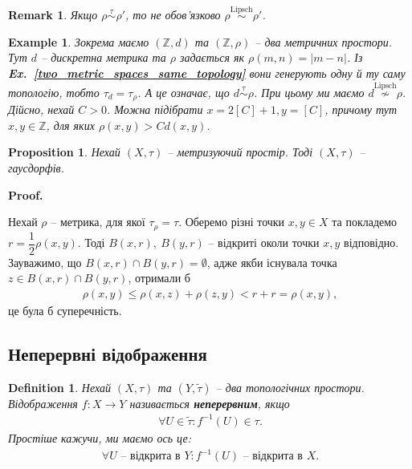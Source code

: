 \documentclass[a4paper, 10pt]{article}
\makeatletter
\theoremstyle{theoremdd}
\newtheorem{definition}[theorem]{Definition}
\newtheorem{example}[theorem]{Example}
\newtheorem{proposition}[theorem]{Proposition}
\newtheorem{remark}[theorem]{Remark}
\newcommand\exref[1]{\textbf{Ex.~\ref{#1}}}
\renewenvironment{proof}[1][Proof.\\]{\par
\pushQED{\hfill \qed}%
\normalfont \topsep6\p@\@plus6\p@\relax
\trivlist
\item\relax
{\bfseries
#1\@addpunct{.}}\hspace\labelsep\ignorespaces
}{%
\popQED\endtrivlist\@endpefalse
}
\makeatother
\begin{document}
\begin{remark}
Якщо $\rho \overset{\tau}{\sim} \rho'$, то не обов'язково $\rho \overset{\text{Lipsch}}{\sim} \rho'$.
\end{remark}

\begin{example}
Зокрема маємо $(\mathbb{Z},d)$ та $(\mathbb{Z},\rho)$ -- два метричних простори. Тут $d$ -- дискретна метрика та $\rho$ задається як $\rho(m,n) = |m-n|$. Із \exref{two_metric_spaces_same_topology} вони генерують одну й ту саму топологію, тобто $\tau_d = \tau_\rho$. А це означає, що $d \overset{\tau}{\sim} \rho$. При цьому ми маємо $d \overset{\text{Lipsch}}{\not\sim} \rho$. Дійсно, нехай $C > 0$. Можна підібрати $x = 2 [C] + 1,y = [C]$, причому тут $x,y \in \mathbb{Z}$, для яких $\rho(x,y) > C d(x,y)$.
\end{example}

\begin{proposition}
Нехай $(X,\tau)$ -- метризуючий простір. Тоді $(X,\tau)$ -- гаусдорфів.
\end{proposition}

\begin{proof}
Нехай $\rho$ -- метрика, для якої $\tau_\rho = \tau$. Оберемо різні точки $x,y \in X$ та покладемо $r = \dfrac{1}{2} \rho(x,y)$. Тоді $B(x,r),\ B(y,r)$ -- відкриті околи точки $x,y$ відповідно. Зауважимо, що $B(x,r) \cap B(y,r) = \emptyset$, адже якби існувала точка $z \in B(x,r) \cap B(y,r)$, отримали б
\begin{align*}
\rho(x,y) \leq \rho(x,z) + \rho(z,y) < r + r = \rho(x,y),
\end{align*}
це була б суперечність.
\end{proof}

\subsection{Неперервні відображення}
\begin{definition}
Нехай $(X,\tau)$ та $(Y,\tilde{\tau})$ -- два топологічних простори.\\
Відображення $f \colon X \to Y$ називається \textbf{неперервним}, якщо
\begin{align*}
\forall U \in \tilde{\tau} : f^{-1}(U) \in \tau.
\end{align*}
Простіше кажучи, ми маємо ось це:
\begin{align*}
\forall U \text{ -- відкрита в } Y: f^{-1}(U) \text{ -- відкрита в } X.
\end{align*}
\end{definition}
\end{document}
